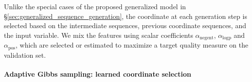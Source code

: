 \documentclass{article}
\begin{document}
Unlike the special cases of the proposed generalized model in \S\ref{sec:generalized_sequence_generation}, the coordinate at each generation step is selected based on the intermediate sequences, previous coordinate sequences, and the input variable. 
We mix the features using scalar coefficients $\alpha_{\text{negent}}$, $\alpha_{\text{logp}}$ and  $\alpha_{\text{pos}}$, which are selected or estimated to maximize a target quality measure on the validation set.

\paragraph{Adaptive Gibbs sampling: learned coordinate selection}\label{par:learned} 
\end{document}
